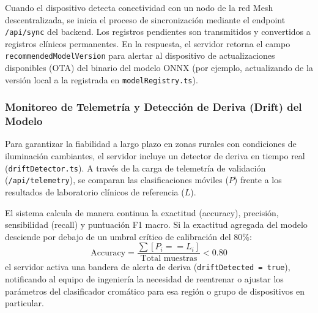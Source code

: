 Cuando el dispositivo detecta conectividad con un nodo de la red Mesh descentralizada, se inicia el proceso de sincronización mediante el endpoint \texttt{/api/sync} del backend. Los registros pendientes son transmitidos y convertidos a registros clínicos permanentes. En la respuesta, el servidor retorna el campo \texttt{recommendedModelVersion} para alertar al dispositivo de actualizaciones disponibles (OTA) del binario del modelo ONNX (por ejemplo, actualizando de la versión local a la registrada en \texttt{modelRegistry.ts}).

\subsubsection{Monitoreo de Telemetría y Detección de Deriva (Drift) del Modelo}
Para garantizar la fiabilidad a largo plazo en zonas rurales con condiciones de iluminación cambiantes, el servidor incluye un detector de deriva en tiempo real (\texttt{driftDetector.ts}). A través de la carga de telemetría de validación (\texttt{/api/telemetry}), se comparan las clasificaciones móviles ($P$) frente a los resultados de laboratorio clínicos de referencia ($L$).

El sistema calcula de manera continua la exactitud (accuracy), precisión, sensibilidad (recall) y puntuación F1 macro. Si la exactitud agregada del modelo desciende por debajo de un umbral crítico de calibración del 80\%:
\begin{equation}
    \text{Accuracy} = \frac{\sum [P_i == L_i]}{\text{Total muestras}} < 0.80
\end{equation}
el servidor activa una bandera de alerta de deriva (\texttt{driftDetected = true}), notificando al equipo de ingeniería la necesidad de reentrenar o ajustar los parámetros del clasificador cromático para esa región o grupo de dispositivos en particular.
